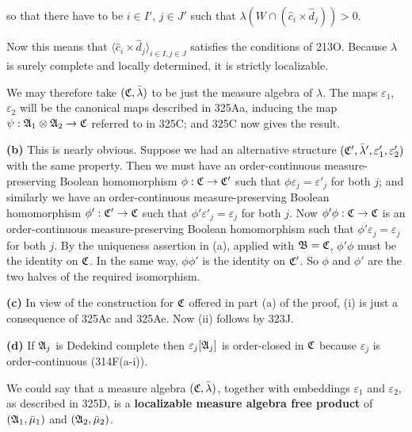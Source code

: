{

\noindent so that there have to be $i\in I'$, $j\in J'$ such that
$\lambda(W\cap(\widehat{c}_i\times\widehat{d}_j))>0$.

Now this means that
$\langle \widehat{c}_i\times\widehat{d}_j\rangle_{i\in I,j\in J}$
satisfies the conditions of 213O.   Because $\lambda$ is surely
complete and locally determined, it is strictly localizable.\ \Qed

\medskip

 We may therefore take $(\frak C,\bar\lambda)$ to be
just the measure algebra of $\lambda$.   The maps $\varepsilon_1$, $\varepsilon_2$
will be the canonical maps described in 325Aa, inducing the map
$\psi:\frak A_1\otimes\frak A_2\to\frak C$ referred to in 325C;  and
325C now gives the result.

\medskip

{\bf (b)} This is nearly obvious.   Suppose we had an alternative
structure $(\frak C',\bar\lambda',\varepsilon'_1,\varepsilon'_2)$
with the same
property.   Then we must have an order-continuous measure-preserving
Boolean homomorphism $\phi:\frak C\to\frak C'$ such that
$\phi\varepsilon_j=\varepsilon'_j$ for both $j$;  and similarly we have an
order-continuous measure-preserving Boolean homomorphism
$\phi':\frak C'\to\frak C$ such that $\phi'\varepsilon'_j=\varepsilon_j$
for both $j$.   Now $\phi'\phi:\frak C\to\frak C$ is an
order-continuous measure-preserving Boolean homomorphism such that
$\phi'\varepsilon_j=\varepsilon_j$ for both $j$.   By the uniqueness assertion in
(a), applied with $\frak B=\frak C$, $\phi'\phi$ must be the
identity on $\frak C$.   In the same way, $\phi\phi'$ is the
identity on $\frak C'$.   So $\phi$ and $\phi'$ are the two halves
of the required isomorphism.

\medskip

{\bf (c)} In view of the construction for $\frak C$ offered in part (a)
of the proof, (i) is just a consequence of 325Ac and 325Ae.   Now (ii)
follows by 323J.

\medskip

{\bf (d)} If $\frak A_j$ is Dedekind complete then $\varepsilon_j[\frak A_j]$
is order-closed in $\frak C$ because $\varepsilon_j$ is order-continuous
(314F(a-i)).
}%

  We could say that a
measure algebra $(\frak C,\bar\lambda)$, together with embeddings
$\varepsilon_1$ and $\varepsilon_2$, as
described in 325D, is a {\bf localizable measure algebra free product}
of $(\frak A_1,\bar\mu_1)$ and $(\frak A_2,\bar\mu_2)$.

